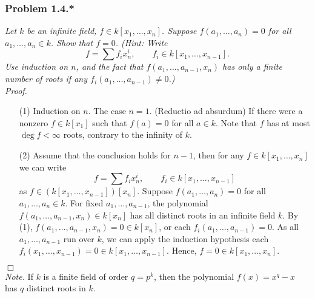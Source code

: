 \documentclass{article}
\begin{document}



\subsubsection*{Problem 1.4.*}
\emph{Let $k$ be an infinite field,
$f \in k[x_1,\ldots,x_n]$.
Suppose $f(a_1,\ldots,a_n) = 0$ for all $a_1, \ldots, a_n \in k$.
Show that $f = 0$.
(Hint: Write
\[
  f = \sum f_i x_n^{i},
  \qquad
  f_i \in k[x_1,\ldots,x_{n-1}].
\]
Use induction on $n$,
and the fact that $f(a_1, \ldots, a_{n-1}, x_n)$
has only a finite number of roots if any $f_i(a_1, \ldots, a_{n-1}) \neq 0$.)} \\



\emph{Proof.}
\begin{enumerate}
\item[(1)]
  Induction on $n$.
  The case $n = 1$.
  (Reductio ad absurdum)
  If there were a nonzero $f \in k[x_1]$ such that $f(a) = 0$ for all $a \in k$.
  Note that $f$ has at most $\deg f < \infty$ roots,
  contrary to the infinity of $k$.

\item[(2)]
  Assume that the conclusion holds for $n - 1$, then for any $f \in k[x_1,\ldots,x_n]$
  we can write
  \[
    f = \sum f_i x_n^{i},
    \qquad
    f_i \in k[x_1,\ldots,x_{n-1}]
  \]
  as $f \in (k[x_1,\ldots,x_{n-1}])[x_n]$.
  Suppose $f(a_1,\ldots,a_n) = 0$ for all $a_1, \ldots, a_n \in k$.
  For fixed $a_1, \ldots, a_{n-1}$,
  the polynomial $f(a_1, \ldots, a_{n-1}, x_n) \in k[x_n]$ has all distinct roots in
  an infinite field $k$.
  By (1), $f(a_1, \ldots, a_{n-1}, x_n) = 0 \in k[x_n]$,
  or each $f_i(a_1, \ldots, a_{n-1}) = 0$.
  As all $a_1, \ldots, a_{n-1}$ run over $k$,
  we can apply the induction hypothesis
  each $f_i(x_1, \ldots, x_{n-1}) = 0 \in k[x_1,\ldots,x_{n-1}]$.
  Hence, $f = 0 \in k[x_1,\ldots,x_{n}]$.
\end{enumerate}
$\Box$ \\



\emph{Note.}
If $k$ is a finite field of order $q = p^k$,
then the polynomial $f(x) = x^q - x$ has $q$ distinct roots in $k$. \\\\



\end{document}
